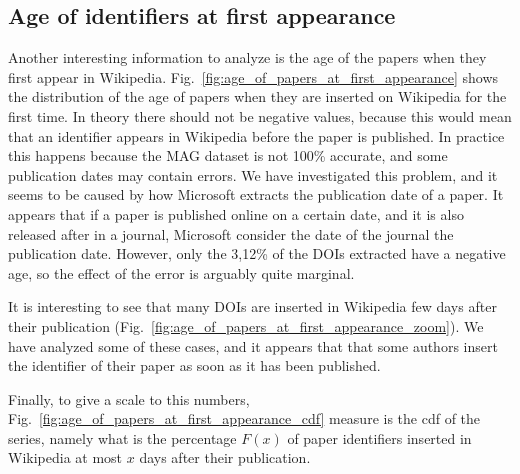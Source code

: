 \subsection{Age of identifiers at first appearance}
Another interesting information to analyze is the age of the papers when they first appear in Wikipedia.
Fig.~\ref{fig:age_of_papers_at_first_appearance} shows the distribution of the age of papers when they are inserted on Wikipedia for the first time.
In theory there should not be negative values, because this would mean that an identifier appears in Wikipedia before the paper is published.
In practice this happens because the \ac{MAG} dataset is not 100\% accurate, and some publication dates may contain errors.
We have investigated this problem, and it seems to be caused by how Microsoft extracts the publication date of a paper.
It appears that if a paper is published online on a certain date, and it is also released after in a journal, Microsoft consider the date of the journal the publication date.
However, only the 3,12\% of the \acp{DOI} extracted have a negative age, so the effect of the error is arguably quite marginal.

It is interesting to see that many \acp{DOI} are inserted in Wikipedia few days after their publication (Fig.~\ref{fig:age_of_papers_at_first_appearance_zoom}).
We have analyzed some of these cases, and it appears that that some authors insert the identifier of their paper as soon as it has been published.

Finally, to give a scale to this numbers, Fig.~\ref{fig:age_of_papers_at_first_appearance_cdf} measure is the \ac{cdf} of the series, namely what is the percentage $F(x)$ of paper identifiers inserted in Wikipedia at most $x$ days after their publication.


